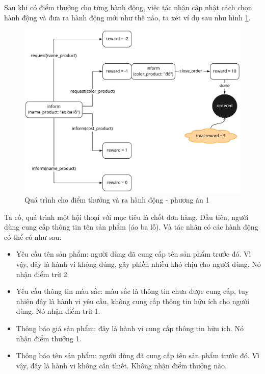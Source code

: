 Sau khi có điểm thưởng cho từng hành động, việc tác nhân cập nhật cách chọn hành động và đưa ra hành động mới như thế nào, ta xét ví dụ sau như hình \ref{fig:dialog2}.

\begin{center}
    \begin{figure}[h!]
        \begin{center}
         \includegraphics[scale=0.18]{chapter3/img/dialog_ex13.jpg}
        \end{center}
        \caption{Quá trình cho điểm thưởng và ra hành động - phương án 1}
        \label{fig:dialog2}
    \end{figure}
\end{center}

Ta có, quá trình một hội thoại với mục tiêu là chốt đơn hàng. Đầu tiên, người dùng cung cấp thông tin tên sản phẩm (áo ba lỗ). Và tác nhân có các hành động có thể có như sau:

\begin{itemize}
    \item Yêu cầu tên sản phẩm: người dùng đã cung cấp tên sản phẩm trước đó. Vì vậy, đây là hành vi không đúng, gây phiền nhiễu khó chịu cho người dùng. Nó nhận điểm trừ 2.
    \item Yêu cầu thông tin màu sắc: màu sắc là thông tin chưa được cung cấp, tuy nhiên đây là hành vi yêu cầu, không cung cấp thông tin hữu ích cho người dùng. Nó nhận điểm trừ 1.
    \item Thông báo giá sản phẩm: đây là hành vi cung cấp thông tin hữu ích. Nó nhận điểm thưởng 1.
    \item Thông báo tên sản phẩm: người dùng đã cung cấp tên sản phẩm trước đó. Vì vậy, đây là hành vi không cần thiết. Không nhận điểm thưởng nào.
\end{itemize}

